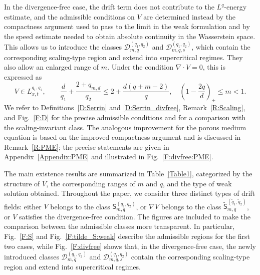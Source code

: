 \documentclass{amsart}
\numberwithin{equation}{section}
\begin{document}
In the divergence-free case, the drift term does not contribute to the $L^q$-energy estimate, and the admissible conditions on $V$ are determined instead by the compactness argument used to pass to the limit in the weak formulation and by the speed estimate needed to obtain absolute continuity in the Wasserstein space. This allows us to introduce the classes $\mathcal{D}_{m,q}^{(q_1,q_2)}$ and $\mathcal{D}_{m,q,s}^{(q_1,q_2)}$, which contain the corresponding scaling-type region and extend into supercritical regimes. They also allow an enlarged range of \(m\). Under the condition \(\nabla\cdot V=0\), this is expressed as
\[
V \in L_{x,t}^{q_1,q_2}, \qquad
\frac{d}{q_1}+\frac{2+q_{m,d}}{q_2}
\leq 2+\frac{d(q+m-2)}{q},
\quad
\left(1-\frac{2q}{d}\right)_{+}\leq m<1.
\]
We refer to Definitions~\ref{D:Serrin} and \ref{D:Serrin_divfree}, Remark~\ref{R:Scaling}, and Fig.~\ref{F:D} for the precise admissible conditions and for a comparison with the scaling-invariant class.
The analogous improvement for the porous medium equation is based on the improved compactness argument and is discussed in Remark~\ref{R:PME}; the precise statements are given in Appendix~\ref{Appendix:PME} and illustrated in Fig.~\ref{F:divfree:PME}.


The main existence results are summarized in Table~\ref{Table1}, categorized by the structure of \(V\), the corresponding ranges of \(m\) and \(q\), and the type of weak solution obtained. Throughout the paper, we consider three distinct types of drift fields: either \(V\) belongs to the class \(\mathsf{S}_{m,q}^{(q_1,q_2)}\), or \(\nabla V\) belongs to the class \(\tilde{\mathsf{S}}_{m,q}^{(\tilde q_1,\tilde q_2)}\), or \(V\) satisfies the divergence-free condition. The figures are included to make the comparison between the admissible classes more transparent. In particular, Fig.~\ref{F:S} and Fig.~\ref{F:tilde_S:weak} describe the admissible regions for the first two cases, while Fig.~\ref{F:divfree} shows that, in the divergence-free case, the newly introduced classes \(\mathcal{D}_{m,q}^{(q_1,q_2)}\) and \(\mathcal{D}_{m,q,s}^{(q_1,q_2)}\) contain the corresponding scaling-type region and extend into supercritical regimes.
\end{document}
